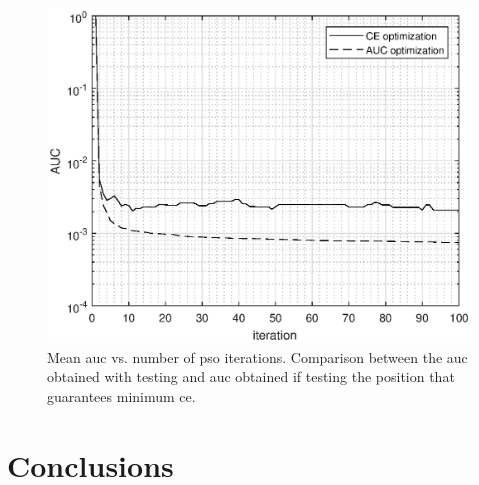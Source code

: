 \documentclass[twocolumns]{IEEEtran}
\begin{document}
\begin{figure}[t]
    \centering
    \includegraphics[width=1\columnwidth]{CE_vsAUC.eps}
    \caption{Mean \ac{auc} vs. number of \ac{pso} iterations. Comparison between the \ac{auc} obtained with testing and \ac{auc} obtained if testing the position that guarantees minimum \ac{ce}.}
    \label{fig:CEvsAUC}
\end{figure}

\section{Conclusions}

\renewcommand*{\bibfont}{\footnotesize}

\printbibliography
\balance
\end{document}
